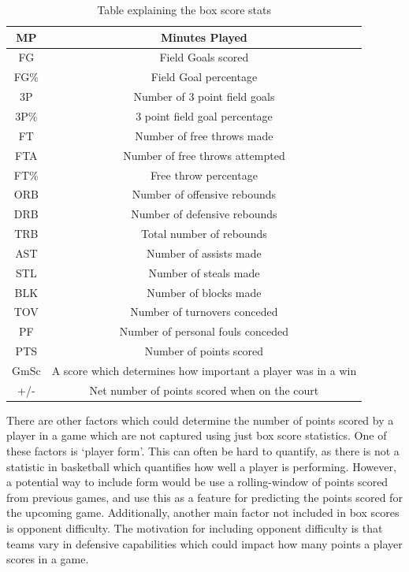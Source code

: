 \documentclass[a4paper,11pt,twoside]{article}
\begin{document}
\vspace{5mm}
\begin{table} [h!]
\begin{center}
\begin{tabular}{ |c|c| } 
 \hline
MP & Minutes Played  \\ 
 \hline
FG & Field Goals scored \\ 
 \hline
FG\% & Field Goal percentage\\ 
 \hline
3P & Number of 3 point field goals\\
 \hline
 3P\% & 3 point field goal percentage\\
\hline
FT & Number of free throws made\\
\hline
FTA & Number of free throws attempted\\
\hline
FT\% & Free throw percentage\\
\hline
ORB & Number of offensive rebounds\\
\hline
DRB & Number of defensive rebounds\\
\hline
TRB & Total number of rebounds\\
\hline
AST & Number of assists made\\
\hline
STL & Number of steals made\\
\hline
BLK & Number of blocks made\\
\hline
TOV & Number of turnovers conceded\\
\hline
PF & Number of personal fouls conceded\\
\hline
PTS & Number of points scored\\
\hline
GmSc & A score which determines how important a player was in a win\\
\hline
+/- & Net number of points scored when on the court\\
\hline
\end{tabular}
\end{center}
\caption{Table explaining the box score stats}
\end{table}
\vspace{5mm}


There are other factors which could determine the number of points scored by a player in a game which are not captured using just box score statistics. One of these factors is `player form'. This can often be hard to quantify, as there is not a statistic in basketball which quantifies how well a player is performing.  However, a potential way to include form would be use a rolling-window of points scored from previous games, and use this as a feature for predicting the points scored for the upcoming game.  Additionally, another main factor not included in box scores is opponent difficulty. The motivation for including opponent difficulty is that teams vary in defensive capabilities which could impact how many points a player scores in a game.
\end{document}
